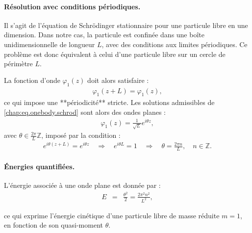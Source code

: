 


\paragraph{Résolution avec conditions périodiques.}

Il s'agit de l’équation de Schrödinger stationnaire pour une particule libre en une dimension. Dans notre cas, la particule est confinée dans une boîte unidimensionnelle de longueur $L$, avec des conditions aux limites périodiques. Ce problème est donc équivalent à celui d’une particule libre sur un cercle de périmètre $L$.

La fonction d’onde $\varphi_1(z)$ doit alors satisfaire :
\begin{eqnarray}
	\varphi_1(z+L) = \varphi_1(z),
\end{eqnarray}
ce qui impose une **périodicité** stricte. Les solutions admissibles de \eqref{chap:eq.onebody.schrod} sont alors des ondes planes :
\begin{eqnarray}
	\varphi_1(z) = \frac{1}{\sqrt{L}} e^{i \theta z},
\end{eqnarray}
avec $\theta \in \frac{2\pi}{L} \mathbb{Z}$, imposé par la condition :
\begin{eqnarray}
	e^{i \theta(z+L)} = e^{i \theta z} \quad \Rightarrow \quad e^{i \theta L} = 1 \quad \Rightarrow \quad \theta = \frac{2\pi n}{L}, \quad n \in \mathbb{Z}.
\end{eqnarray}


\paragraph{Énergies quantifiées.}

L’énergie associée à une onde plane est donnée par :
\begin{eqnarray}
	E & = & \frac{\theta^2}{2} = \frac{2\pi^2 n^2}{L^2},
\end{eqnarray}

ce qui exprime l’énergie cinétique d’une particule libre de masse réduite $m = 1$, en fonction de son quasi-moment $\theta$.

